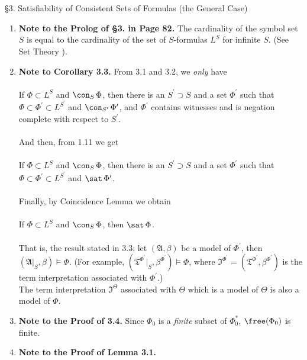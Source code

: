 \ 
\\
\\
{\large \S3. Satisfiability of Consistent Sets of Formulas (the General Case)}
\begin{enumerate}[1.]
\item \textbf{Note to the Prolog of \S3. in Page 82.} The cardinality of the symbol set $S$ is equal to the cardinality of the set of $S$-formulas $L^S$ for infinite $S$. (See Set Theory \cite{Thomas_Jech}).
%
\item \textbf{Note to Corollary 3.3.} From 3.1 and 3.2, we \emph{only} have\\
\ \\
If $\Phi \subset L^S$ and $\con_S \, \Phi$, then there is an $S^\prime \supset S$ and a set $\Phi^\prime$ such that $\Phi \subset \Phi^\prime \subset L^{S^\prime}$ and $\con_{S^\prime} \, \Phi^\prime$, and $\Phi^\prime$ contains witnesses and is negation complete with respect to $S^\prime$.\\
\ \\
And then, from 1.11 we get\\
\ \\
If $\Phi \subset L^S$ and $\con_S \, \Phi$, then there is an $S^\prime \supset S$ and a set $\Phi^\prime$ such that $\Phi \subset \Phi^\prime \subset L^{S^\prime}$ and $\sat \, \Phi^\prime$.\\
\ \\
Finally, by Coincidence Lemma we obtain\\
\ \\
If $\Phi \subset L^S$ and $\con_S \, \Phi$, then $\sat \, \Phi$.\\
\ \\
That is, the result stated in 3.3; let $(\mathfrak{A}, \beta)$ be a model of $\Phi^\prime$, then $(\mathfrak{A}|_S, \beta) \models \Phi$. (For example, $(\mathfrak{T}^{\Phi^\prime}|_S, \beta^{\Phi^\prime}) \models \Phi$, where $\mathfrak{I}^{\Phi^\prime} = (\mathfrak{T}^{\Phi^\prime}, \beta^{\Phi^\prime})$ is the term interpretation associated with $\Phi^\prime$.)\\
The term interpretation $\mathfrak{I}^\Theta$ associated with $\Theta$ which is a model of $\Theta$ is also a model of $\Phi$.
%
\item \textbf{Note to the Proof of 3.4.} Since $\Phi_0$ is a \textit{finite} subset of $\Phi_0^\ast$, $\free(\Phi_0)$ is finite.
%
\item \textbf{Note to the Proof of Lemma 3.1.}

\end{enumerate}
